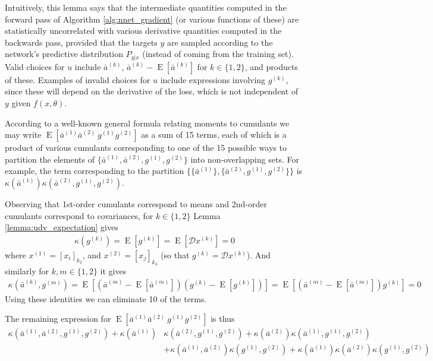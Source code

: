 \documentclass[12pt]{article}
\newcommand{\expected}{\operatorname{E}}
\newcommand{\deriv}{\mathcal{D}}
\begin{document}
Intuitively, this lemma says that the intermediate quantities computed in the forward pass of Algorithm \ref{alg:nnet_gradient} (or various functions of these) are statistically uncorrelated with various derivative quantities computed in the backwards pass, provided that the targets $y$ are sampled according to the network's predictive distribution $P_{y|x}$ (instead of coming from the training set).  Valid choices for $u$ include $\bar{a}^{(k)}$, $\bar{a}^{(k)} - \expected \left[ \bar{a}^{(k)} \right]$ for $k \in \{1,2\}$, and products of these.  Examples of invalid choices for $u$ include expressions involving $g^{(k)}$, since these will depend on the derivative of the loss, which is not independent of $y$ given $f(x,\theta)$.

According to a well-known general formula relating moments to cumulants we may write $\expected \left[ \bar{a}^{(1)} \bar{a}^{(2)} \: g^{(1)} g^{(2)} \right]$ as a sum of 15 terms, each of which is a product of various cumulants corresponding to one of the 15 possible ways to partition the elements of $\{\bar{a}^{(1)}, \bar{a}^{(2)}, g^{(1)}, g^{(2)}\}$ into non-overlapping sets.  For example, the term corresponding to the partition $\{\{\bar{a}^{(1)}\}, \{\bar{a}^{(2)}, g^{(1)}, g^{(2)}\}\}$ is $\kappa( \bar{a}^{(1)} ) \kappa( \bar{a}^{(2)}, g^{(1)}, g^{(2)} )$.

Observing that 1st-order cumulants correspond to means and 2nd-order cumulants correspond to covariances, for $k \in \{1,2\}$ Lemma \ref{lemma:udv_expectation} gives 
\begin{align*}
\kappa(g^{(k)}) = \expected \left[ g^{(k)} \right] = \expected \left[ \deriv x^{(k)} \right] = 0
\end{align*}
where $x^{(1)} = [x_i]_{k_2}$, and $x^{(2)} = [x_j]_{k_4}$ (so that $g^{(k)} = \deriv x^{(k)}$).  And similarly for $k,m \in \{1,2\}$ it gives
\begin{align*}
\kappa(\bar{a}^{(k)},g^{(m)}) = \expected \left[ \left( \bar{a}^{(m)} - \expected\left[ \bar{a}^{(m)} \right]\right) \left (g^{(k)} - \expected \left[ g^{(k)} \right] \right) \right] = \expected \left[ \left( \bar{a}^{(m)} - \expected\left[ \bar{a}^{(m)} \right]\right) g^{(k)} \right] = 0
\end{align*}
Using these identities we can eliminate 10 of the terms.

The remaining expression for $\expected \left[ \bar{a}^{(1)} \bar{a}^{(2)} \: g^{(1)} g^{(2)} \right]$ is thus
\begin{align*}
\kappa(\bar{a}^{(1)}, \bar{a}^{(2)}, g^{(1)}, g^{(2)}) + \kappa(\bar{a}^{(1)}) & \kappa(\bar{a}^{(2)}, g^{(1)}, g^{(2)}) + \kappa(\bar{a}^{(2)})\kappa(\bar{a}^{(1)}, g^{(1)}, g^{(2)}) \\
&+ \kappa( \bar{a}^{(1)}, \bar{a}^{(2)} ) \kappa( g^{(1)}, g^{(2)} ) + \kappa( \bar{a}^{(1)} ) \kappa( \bar{a}^{(2)} ) \kappa( g^{(1)}, g^{(2)} )
\end{align*}
\end{document}
